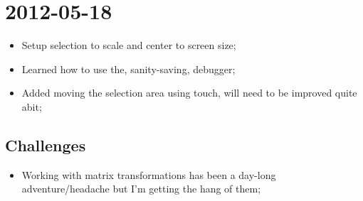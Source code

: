 \documentclass{report}
\begin{document}
\section*{2012-05-18}
\begin{itemize}
  \item
    Setup selection to scale and center to screen size;
  \item
    Learned how to use the, sanity-saving, debugger;
  \item
    Added moving the selection area using touch, will need to be improved quite abit;
\end{itemize}
\subsection*{Challenges}
\begin{itemize}
  \item
    Working with matrix transformations has been a day-long adventure/headache but I'm getting the hang of them;
\end{itemize}
\end{document}
